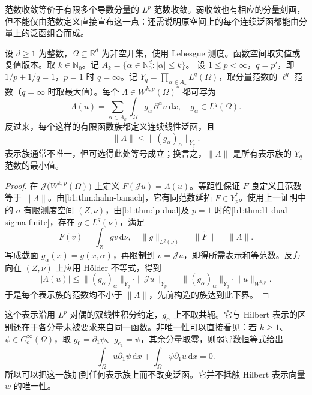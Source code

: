 范数收敛等价于有限多个导数分量的 \(L^p\) 范数收敛。弱收敛也有相应的分量刻画，但不能仅由范数定义直接宣布这一点：还需说明原空间上的每个连续泛函都能由分量上的泛函组合而成。

\begin{proposition}\label{b1:prop:sobolev-functional-representation}
设 \(d\geq1\) 为整数，\(\Omega\subseteq\mathbb R^d\) 为非空开集，使用 Lebesgue 测度。函数空间取实值或复值版本。取 \(k\in\mathbb N_0\)。记 \(A_k=\{\alpha\in\mathbb N_0^d:|\alpha|\leq k\}\)。
设 \(1\leq p<\infty\)，\(q=p'\)，即 \(1/p+1/q=1\)，\(p=1\) 时 \(q=\infty\)。记 \(Y_q=\prod_{\alpha\in A_k}L^q(\Omega)\)，取分量范数的 \(\ell^q\) 范数（\(q=\infty\) 时取最大值）。每个 \(\Lambda\in W^{k,p}(\Omega)^*\) 都可写为
\begin{equation}\label{b1:eq:sobolev-functional-representation}
 \Lambda(u)=\sum_{\alpha\in A_k}
   \int_\Omega g_\alpha\,\partial^\alpha u\,\mathrm dx,
 \quad g_\alpha\in L^q(\Omega).
\end{equation}
反过来，每个这样的有限函数族都定义连续线性泛函，且
\[
 \|\Lambda\|\leq\|(g_\alpha)_\alpha\|_{Y_q}.
\]
表示族通常不唯一，但可选得此处等号成立；换言之，\(\|\Lambda\|\) 是所有表示族的 \(Y_q\) 范数的最小值。
\end{proposition}
\begin{proof}
在 \(\mathcal J\bigl(W^{k,p}(\Omega)\bigr)\) 上定义 \(F(\mathcal Ju)=\Lambda(u)\)。等距性保证 \(F\) 良定义且范数等于 \(\|\Lambda\|\)。由\cref{b1:thm:hahn-banach}，它有同范数延拓 \(\widetilde F\in Y_p^*\)。使用上一证明中的 \(\sigma\)-有限测度空间 \((Z,\nu)\)，由\cref{b1:thm:lp-dual}及 \(p=1\) 时的\cref{b1:thm:l1-dual-sigma-finite}，存在 \(g\in L^q(\nu)\)，满足
\[
 \widetilde F(v)=\int_Zgv\,\mathrm d\nu,
 \quad\|g\|_{L^q(\nu)}=\|\widetilde F\|=\|\Lambda\|.
\]
写成截面 \(g_\alpha(x)=g(x,\alpha)\)，再限制到 \(v=\mathcal Ju\)，即得所需表示和等范数。反方向在 \((Z,\nu)\) 上应用 Hölder 不等式，得到
\[
 |\Lambda(u)|
 \leq\|(g_\alpha)_\alpha\|_{Y_q}\cdot\|\mathcal Ju\|_{Y_p}
 =\|(g_\alpha)_\alpha\|_{Y_q}\cdot\|u\|_{W^{k,p}}.
\]
于是每个表示族的范数均不小于 \(\|\Lambda\|\)，先前构造的族达到此下界。
\end{proof}

这个表示沿用 \(L^p\) 对偶的双线性积分约定，\(g_\alpha\) 上不取共轭。它与 Hilbert 表示的区别还在于各分量未被要求来自同一函数。非唯一性可以直接看见：若 \(k\geq1\)、\(\psi\in C_c^\infty(\Omega)\)，取 \(g_0=\partial_1\psi\)、\(g_{e_1}=\psi\)，其余分量取零，则弱导数恒等式给出
\[
 \int_\Omega u\partial_1\psi\,\mathrm dx
 +\int_\Omega\psi\partial_1u\,\mathrm dx=0.
\]
所以可以把这一族加到任何表示族上而不改变泛函。它并不抵触 Hilbert 表示向量 \(w\) 的唯一性。

